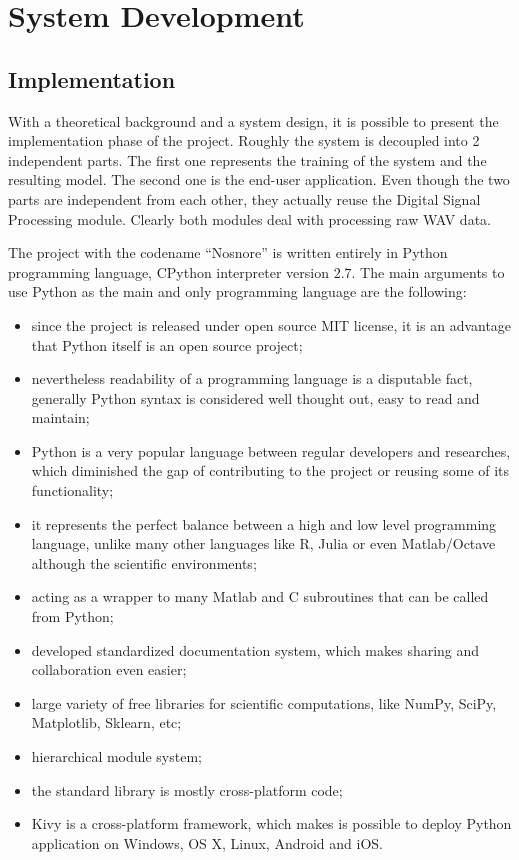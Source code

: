 \section{System Development}\label{sec:development}

\subsection{Implementation}
With a theoretical background and a system design, it is possible to present the implementation phase of the project. Roughly the system is decoupled into 2 independent parts. The first one represents the training of the system and the resulting model. The second one is the end-user application. Even though the two parts are independent from each other, they actually reuse the Digital Signal Processing module. Clearly both modules deal with processing raw WAV data.

The project with the codename ``Nosnore'' is written entirely in Python programming language, CPython interpreter version $2.7$. The main arguments to use Python as the main and only programming language are the following:

\begin{itemize}[topsep=5pt, partopsep=0pt,itemsep=3pt,parsep=1pt]
 \item since the project is released under open source MIT license, it is an advantage that Python itself is an open source project;
 \item nevertheless readability of a programming language is a disputable fact, generally Python syntax is considered well thought out, easy to read and maintain;
 \item Python is a very popular language between regular developers and researches, which diminished the gap of contributing to the project or reusing some of its functionality;
 \item it represents the perfect balance between a high and low level programming language, unlike many other languages like R, Julia or even Matlab/Octave although the scientific environments;
 \item acting as a wrapper to many Matlab and C subroutines that can be called from Python;
 \item developed standardized documentation system, which makes sharing and collaboration even easier;
 \item large variety of free libraries for scientific computations, like NumPy, SciPy, Matplotlib, Sklearn, etc;
 \item hierarchical module system;
 \item the standard library is mostly cross-platform code;
 \item Kivy is a cross-platform framework, which makes is possible to deploy Python application on Windows, OS X, Linux, Android and iOS.
\end{itemize}

